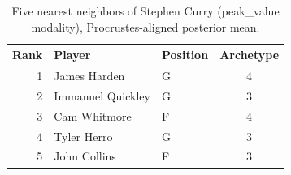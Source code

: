 \begin{table}[htbp]
  \centering\small
  \begin{tabular}{rllc}
    \toprule
    Rank & Player & Position & Archetype \\
    \midrule
    1 & James Harden & G & 4 \\
    2 & Immanuel Quickley & G & 3 \\
    3 & Cam Whitmore & F & 4 \\
    4 & Tyler Herro & G & 3 \\
    5 & John Collins & F & 3 \\
    \bottomrule
  \end{tabular}
  \caption{Five nearest neighbors of Stephen Curry (peak_value modality), Procrustes-aligned posterior mean.}
  \label{tab:Stephen_Curry_neighbors_peak_value}
\end{table}

